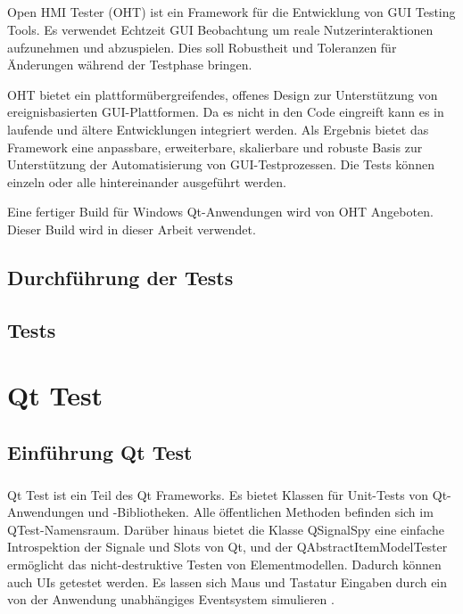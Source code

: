 		\paragraph{} Open HMI Tester (OHT) ist ein Framework für die Entwicklung von GUI Testing Tools. Es verwendet Echtzeit GUI Beobachtung um reale Nutzerinteraktionen aufzunehmen und abzuspielen. Dies soll Robustheit und Toleranzen für Änderungen während der Testphase bringen.
		
		OHT bietet ein plattformübergreifendes, offenes Design zur Unterstützung von ereignisbasierten GUI-Plattformen. Da es nicht in den Code eingreift kann es in laufende und ältere Entwicklungen integriert werden. Als Ergebnis bietet das Framework eine anpassbare, erweiterbare, skalierbare und robuste Basis zur Unterstützung der Automatisierung von GUI-Testprozessen. Die Tests können einzeln oder alle hintereinander ausgeführt werden.  
		
		Eine fertiger Build für Windows Qt-Anwendungen wird von OHT Angeboten. Dieser Build wird in dieser Arbeit verwendet.
		
		
		\section{Durchführung der Tests}
		\section{Tests}
		
\chapter{Qt Test}
		
		\section{Einführung Qt Test}
		\paragraph{} Qt Test ist ein Teil des Qt Frameworks. Es bietet Klassen für Unit-Tests von Qt-Anwendungen und -Bibliotheken. Alle öffentlichen Methoden befinden sich im QTest-Namensraum. Darüber hinaus bietet die Klasse QSignalSpy eine einfache Introspektion der Signale und Slots von Qt, und der QAbstractItemModelTester ermöglicht das nicht-destruktive Testen von Elementmodellen. Dadurch können auch UIs getestet werden. Es lassen sich Maus und Tastatur Eingaben durch ein von der Anwendung unabhängiges Eventsystem simulieren \cite{documentationQt}.
		
